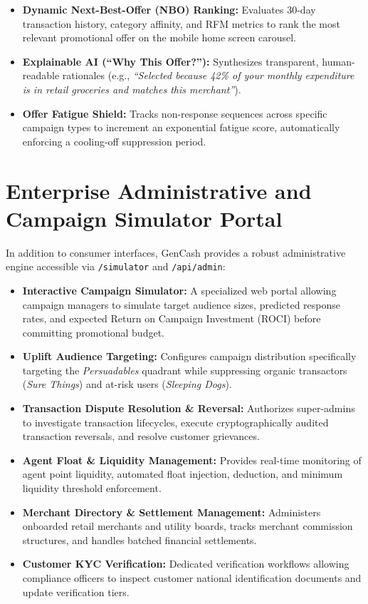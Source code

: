 \documentclass[10.5pt,a4paper]{article}
\begin{document}
\begin{itemize}[leftmargin=*]
    \item \textbf{Dynamic Next-Best-Offer (NBO) Ranking:} Evaluates 30-day transaction history, category affinity, and RFM metrics to rank the most relevant promotional offer on the mobile home screen carousel.
    \item \textbf{Explainable AI (``Why This Offer?''):} Synthesizes transparent, human-readable rationales (e.g., \textit{``Selected because 42\% of your monthly expenditure is in retail groceries and matches this merchant''}).
    \item \textbf{Offer Fatigue Shield:} Tracks non-response sequences across specific campaign types to increment an exponential fatigue score, automatically enforcing a cooling-off suppression period.
\end{itemize}

\section{Enterprise Administrative and Campaign Simulator Portal}

In addition to consumer interfaces, GenCash provides a robust administrative engine accessible via \texttt{/simulator} and \texttt{/api/admin}:
\begin{itemize}[leftmargin=*]
    \item \textbf{Interactive Campaign Simulator:} A specialized web portal allowing campaign managers to simulate target audience sizes, predicted response rates, and expected Return on Campaign Investment (ROCI) before committing promotional budget.
    \item \textbf{Uplift Audience Targeting:} Configures campaign distribution specifically targeting the \textit{Persuadables} quadrant while suppressing organic transactors (\textit{Sure Things}) and at-risk users (\textit{Sleeping Dogs}).
    \item \textbf{Transaction Dispute Resolution \& Reversal:} Authorizes super-admins to investigate transaction lifecycles, execute cryptographically audited transaction reversals, and resolve customer grievances.
    \item \textbf{Agent Float \& Liquidity Management:} Provides real-time monitoring of agent point liquidity, automated float injection, deduction, and minimum liquidity threshold enforcement.
    \item \textbf{Merchant Directory \& Settlement Management:} Administers onboarded retail merchants and utility boards, tracks merchant commission structures, and handles batched financial settlements.
    \item \textbf{Customer KYC Verification:} Dedicated verification workflows allowing compliance officers to inspect customer national identification documents and update verification tiers.
\end{itemize}
\end{document}
